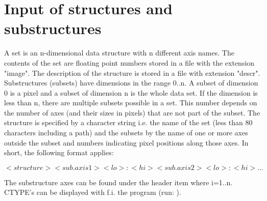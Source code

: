 \section{Input of structures and substructures }

A set is an n-dimensional data structure with n different axis names. 
The contents of the set are floating point numbers stored in a file with 
the extension "image". The description of the structure is stored in a 
file with extension "descr". Substructures (subsets) have dimensions in 
the range 0..n. A subset of dimension 0 is a pixel and a subset of 
dimension n is the whole data set. If the dimension is less than n, there 
are multiple subsets possible in a set. This number depends on the number of axes 
(and their sizes in pixels) that are not part of the subset.
The structure is specified by a character string i.e. the name of the set 
(less than 80 characters including a path) and the subsets by the name of 
one or more axes outside the subset and numbers indicating pixel positions 
along those axes.  In short, the following format applies:
              
$$   <structure> <sub.axis1> <lo>:<hi> <sub.axis2> <lo>:<hi> ... $$

The substructure axes can be found under the header item 
where i=1..n.
CTYPE's can be displayed with f.i. the program  
(run:  ).

